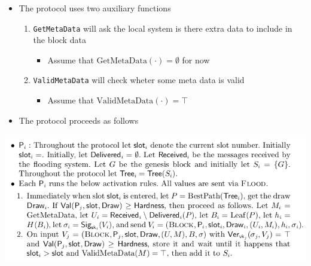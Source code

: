 \documentclass[11pt]{article}
\begin{document}
\begin{itemize}
\item The protocol uses two auxiliary functions
\begin{enumerate}
\item \texttt{GetMetaData} will ask the local system is there extra data to include in the block data
\begin{itemize}
\item Assume that \(\text{GetMetaData}(\cdot) = \emptyset\) for now
\end{itemize}
\item \texttt{ValidMetaData} will check wheter some meta data is valid
\begin{itemize}
\item Assume that \(\text{ValidMetaData}(\cdot) = \top\)
\end{itemize}
\end{enumerate}

\item The protocol proceeds as follows
\end{itemize}
\begin{center}
\includegraphics[width=.9\linewidth]{Blockchains/screenshot_2018-10-28_10-35-05.png}
\end{center}
\end{document}
